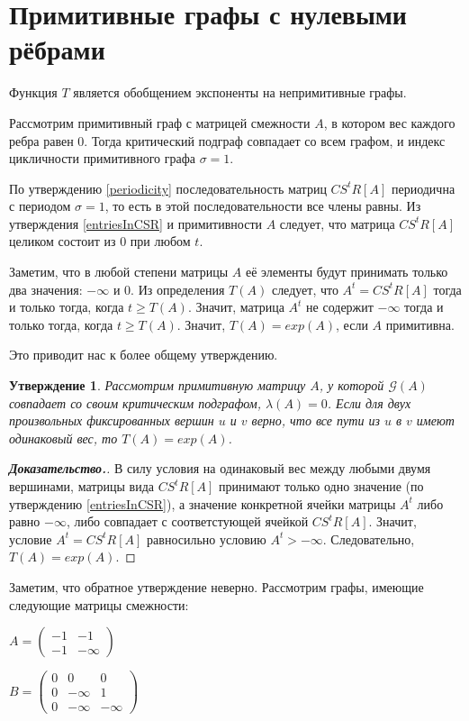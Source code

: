 \documentclass[12pt]{article}
\newtheorem{proposition}[theorem]{Утверждение}
\begin{document}
\section{Примитивные графы с нулевыми рёбрами}
\label{primitive}
Функция $T$ является обобщением экспоненты на непримитивные графы.

Рассмотрим примитивный граф с матрицей смежности $A$, в котором вес каждого ребра равен $0$. Тогда критический подграф совпадает со всем графом, и индекс цикличности примитивного графа $\sigma = 1$.

По утверждению \ref{periodicity} последовательность матриц $CS^tR[A]$ периодична с периодом $\sigma = 1$, то есть в этой последовательности все члены равны. Из утверждения \ref{entriesInCSR} и примитивности $A$ следует, что матрица $CS^tR[A]$ целиком состоит из $0$ при любом $t$.

Заметим, что в любой степени матрицы $A$ её элементы будут принимать только два значения: $-\infty$ и $0$. Из определения $T(A)$ следует, что $A^t = CS^tR[A]$ тогда и только тогда, когда $t \ge T(A)$. Значит, матрица $A^t$ не содержит $-\infty$ тогда и только тогда, когда $t \ge T(A)$. Значит, $T(A) = exp(A)$, если $A$ примитивна.

Это приводит нас к более общему утверждению.

\begin{proposition} \label{onePathProposition}
Рассмотрим примитивную матрицу $A$, у которой $\mathcal{G}(A)$ совпадает со своим критическим подграфом, $\lambda(A) = 0$. Если для двух произвольных фиксированных вершин $u$ и $v$ верно, что все пути из $u$ в $v$ имеют одинаковый вес, то $T(A) = exp(A)$.
\end{proposition}
\begin{proof}[\textbf{Доказательство.}]
В силу условия на одинаковый вес между любыми двумя вершинами, матрицы вида $CS^tR[A]$ принимают только одно значение (по утверждению \ref{entriesInCSR}), а значение конкретной ячейки матрицы $A^t$ либо равно $-\infty$, либо совпадает с соответстующей ячейкой $CS^tR[A]$. Значит, условие $A^t = CS^tR[A]$ равносильно условию $A^t > -\infty$. Следовательно, $T(A) = exp(A)$.
\end{proof}

Заметим, что обратное утверждение неверно. Рассмотрим графы, имеющие следующие матрицы смежности:

\begin{minipage}[t]{0.4\textwidth}
\centering
$A = \begin{pmatrix}
    -1 & -1 \\
    -1 & -\infty
    \end{pmatrix}$
\end{minipage}
\begin{minipage}[t]{0.4\textwidth}
\centering
$B = \begin{pmatrix}
    0 & 0 & 0 \\
    0 & -\infty & 1 \\
    0 & -\infty & -\infty
    \end{pmatrix}$
\end{minipage}
\end{document}
